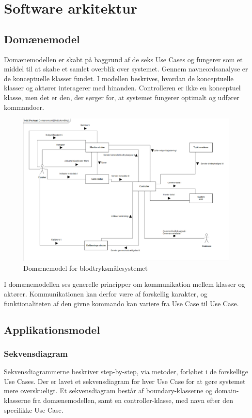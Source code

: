 \section{Software arkitektur}

\subsection{Domænemodel}
Domænemodellen er skabt på baggrund af de seks Use Cases og fungerer som et middel til at skabe et samlet overblik over systemet. Gennem navneordsanalyse er de konceptuelle klasser fundet. I modellen beskrives, hvordan de konceptuelle klasser og aktører interagerer med hinanden. Controlleren er ikke en konceptuel klasse, men det er den, der sørger for, at systemet fungerer optimalt og udfører kommandoer.

\begin{figure}[H]
	\centering
	\includegraphics[width=1 \textwidth]{Figurer/screenshot}
	\caption{Domænemodel for blodtryksmålesystemet}
\end{figure}
I domænemodellen ses generelle principper om kommunikation mellem klasser og aktører. Kommunikationen kan derfor være af forskellig karakter, og funktionaliteten af den givne kommando kan variere fra Use Case til Use Case.

\subsection{Applikationsmodel}

\subsubsection{Sekvensdiagram}
Sekvensdiagrammerne beskriver step-by-step, via metoder, forløbet i de forskellige Use Cases. Der er lavet et sekvensdiagram for hver Use Case for at gøre systemet mere overskueligt. Et sekvensdiagram består af boundary-klasserne og domain-klasserne fra domænemodellen, samt en controller-klasse, med navn efter den specifikke Use Case.

